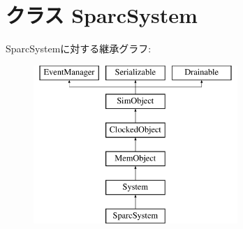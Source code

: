 \hypertarget{classSparcSystem_1_1SparcSystem}{
\section{クラス SparcSystem}
\label{classSparcSystem_1_1SparcSystem}
}
SparcSystemに対する継承グラフ:\begin{figure}[H]
\begin{center}
\leavevmode
\includegraphics[height=6cm]{classSparcSystem_1_1SparcSystem}
\end{center}
\end{figure}
